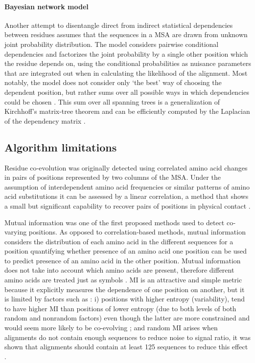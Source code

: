 \paragraph{Bayesian network model}
Another attempt to disentangle direct from indirect statistical dependencies between residues assumes that the sequences in a MSA are drawn from unknown joint probability distribution. 
The model considers pairwise conditional dependencies and factorizes the joint probability by a single other position which the residue depends on, using the conditional probabilities as nuisance parameters that are integrated out when in calculating the likelihood of the alignment. 
Most notably, the model does not consider only `the best' way of choosing the dependent position, but rather sums over all possible ways in which dependencies could be chosen \cite{burger2010disentangling}.
This sum over all spanning trees is a generalization of Kirchhoff's matrix-tree theorem and can be efficiently computed by the Laplacian of the dependency matrix \cite{burger2010disentangling}.

\subsection{Algorithm limitations}

Residue co‐evolution was originally detected using correlated amino acid changes in pairs of positions represented by two columns of the MSA.
Under the assumption of interdependent amino acid frequencies or similar patterns of amino acid substitutions it can be assessed by a linear correlation, a method that shows a small but significant capability to recover pairs of positions in physical contact \cite{de2013emerging}.

Mutual information was one of the first proposed methods used to detect co‐varying positions. 
As opposed to correlation‐based methods, mutual information considers the distribution of each amino acid in the different sequences for a position quantifying whether presence of an amino acid one position can be used to predict presence of an amino acid in the other position.
Mutual information does not take into account which amino acids are present, therefore different amino acids are treated just as symbols \cite{de2013emerging}.
MI is an attractive and simple metric because it explicitly measures the dependence of one position on another, but it is limited by factors such as \cite{dunn2008mutual}: i) positions with higher entropy (variability), tend to have higher MI than positions of lower entropy (due to both levels of both random and nonrandom factors) even though the latter are more constrained and would seem more likely to be co-evolving \cite{dunn2008mutual}; and random MI arises when alignments do not contain enough sequences to reduce noise to signal ratio, it was shown that alignments should contain at least 125 sequences to reduce this effect \cite{dunn2008mutual:REF(Martin et al., 2005)}.

